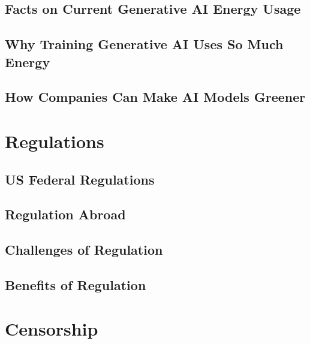 \documentclass[
]{book}
\begin{document}
\hypertarget{facts-on-current-generative-ai-energy-usage}{%
\section{Facts on Current Generative AI Energy Usage}\label{facts-on-current-generative-ai-energy-usage}}

\hypertarget{why-training-generative-ai-uses-so-much-energy}{%
\section{Why Training Generative AI Uses So Much Energy}\label{why-training-generative-ai-uses-so-much-energy}}

\hypertarget{how-companies-can-make-ai-models-greener}{%
\section{How Companies Can Make AI Models Greener}\label{how-companies-can-make-ai-models-greener}}

\hypertarget{regulations}{%
\chapter{Regulations}\label{regulations}}

\hypertarget{us-federal-regulations}{%
\section{US Federal Regulations}\label{us-federal-regulations}}

\hypertarget{regulation-abroad}{%
\section{Regulation Abroad}\label{regulation-abroad}}

\hypertarget{challenges-of-regulation}{%
\section{Challenges of Regulation}\label{challenges-of-regulation}}

\hypertarget{benefits-of-regulation}{%
\section{Benefits of Regulation}\label{benefits-of-regulation}}

\hypertarget{censorship}{%
\chapter{Censorship}\label{censorship}}
\end{document}
